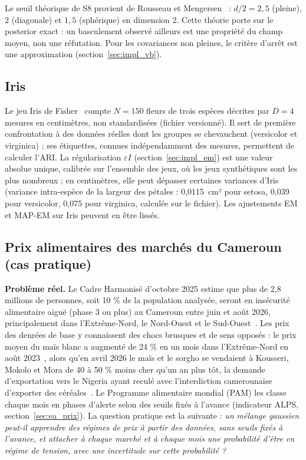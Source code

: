 Le seuil théorique de S8 provient de Rousseau et Mengersen~\cite{rousseau2011} : $d/2 = 2{,}5$ (pleine), $2$ (diagonale) et $1{,}5$ (sphérique) en dimension 2. Cette théorie porte sur le posterior exact : un basculement observé ailleurs est une propriété du champ moyen, non une réfutation. Pour les covariances non pleines, le critère d'arrêt est une approximation (section~\ref{sec:impl_vb}).

\subsection{Iris}\label{sec:iris_methodo}
Le jeu Iris de Fisher~\cite{fisher1936} compte $N=150$ fleurs de trois espèces décrites par $D=4$ mesures en centimètres, non standardisées (fichier versionné). Il sert de première confrontation à des données réelles dont les groupes se chevauchent (versicolor et virginica) ; ses étiquettes, connues indépendamment des mesures, permettent de calculer l'ARI. La régularisation $\varepsilon I$ (section~\ref{sec:impl_em}) est une valeur absolue unique, calibrée sur l'ensemble des jeux, où les jeux synthétiques sont les plus nombreux ; en centimètres, elle peut dépasser certaines variances d'Iris (variance intra-espèce de la largeur des pétales : 0,0115~cm² pour setosa, 0,039 pour versicolor, 0,075 pour virginica, calculée sur le fichier). Les ajustements EM et MAP-EM sur Iris peuvent en être lissés.

\subsection{Prix alimentaires des marchés du Cameroun (cas pratique)}\label{sec:prix_methodo}
\textbf{Problème réel. }Le Cadre Harmonisé d'octobre 2025 estime que plus de 2,8 millions de personnes, soit 10 \% de la population analysée, seront en insécurité alimentaire aiguë (phase 3 ou plus) au Cameroun entre juin et août 2026, principalement dans l'Extrême-Nord, le Nord-Ouest et le Sud-Ouest~\cite{giews2026,fewsnet2026}. Les prix des denrées de base y connaissent des chocs brusques et de sens opposés : le prix moyen du maïs blanc a augmenté de 24 \% en un mois dans l'Extrême-Nord en août 2023~\cite{pam2023bulletin}, alors qu'en avril 2026 le maïs et le sorgho se vendaient à Kousseri, Mokolo et Mora de 40 à 50 \% moins cher qu'un an plus tôt, la demande d'exportation vers le Nigeria ayant reculé avec l'interdiction camerounaise d'exporter des céréales~\cite{fewsnet2026}. Le Programme alimentaire mondial (PAM) les classe chaque mois en phases d'alerte selon des seuils fixés à l'avance (indicateur ALPS, section~\ref{sec:ea_prix}). La question pratique est la suivante : \emph{un mélange gaussien peut-il apprendre des régimes de prix à partir des données, sans seuils fixés à l'avance, et attacher à chaque marché et à chaque mois une probabilité d'être en régime de tension, avec une incertitude sur cette probabilité ?}

